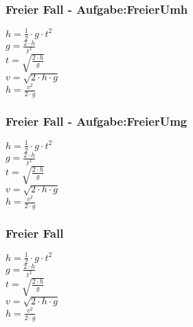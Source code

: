 \subsubsection{Freier Fall - Aufgabe:FreierUmh} 
\begin{minipage}{0.45\textwidth} 
$ h = \frac{1}{2}\cdot g\cdot t^{2} $\\ 
$ g = \frac{2\cdot h}{ t^{2} } $\\ 
$ t = \sqrt{\frac{2\cdot h}{g}} $\\ 
$ v = \sqrt{2\cdot h\cdot g} $\\ 
$ h = \frac{ v^{2} }{2\cdot g} $\\ 
\end{minipage} 
\begin{minipage}{0.45\textwidth} 
 
\end{minipage} 
\subsubsection{Freier Fall - Aufgabe:FreierUmg} 
\begin{minipage}{0.45\textwidth} 
$ h = \frac{1}{2}\cdot g\cdot t^{2} $\\ 
$ g = \frac{2\cdot h}{ t^{2} } $\\ 
$ t = \sqrt{\frac{2\cdot h}{g}} $\\ 
$ v = \sqrt{2\cdot h\cdot g} $\\ 
$ h = \frac{ v^{2} }{2\cdot g} $\\ 
\end{minipage} 
\begin{minipage}{0.45\textwidth} 
 
\end{minipage} 
\subsubsection{Freier Fall} 
\begin{minipage}{0.45\textwidth} 
$ h = \frac{1}{2}\cdot g\cdot t^{2} $\\ 
$ g = \frac{2\cdot h}{ t^{2} } $\\ 
$ t = \sqrt{\frac{2\cdot h}{g}} $\\ 
$ v = \sqrt{2\cdot h\cdot g} $\\ 
$ h = \frac{ v^{2} }{2\cdot g} $\\ 
\end{minipage} 
\begin{minipage}{0.45\textwidth} 
 
\end{minipage} 
